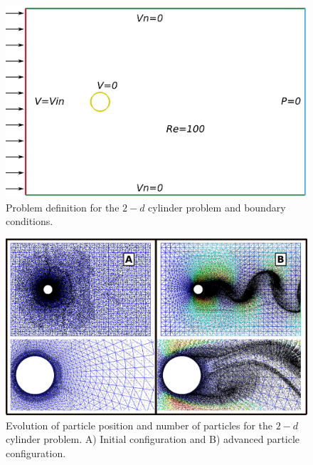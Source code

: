 \begin{figure}[htp] 
\centering 
\includegraphics[scale=.5]{./imgs/cyl_def.png}
\caption{Problem definition for the $2-d$ cylinder problem and boundary conditions.}
\label{fig:cyl_def}
\end{figure}
%
\begin{figure}[htp]
\centering 
\includegraphics[scale=.35]{./imgs/cyl_parts.png}
\caption{Evolution of particle position and number of particles for the $2-d$ cylinder problem. A) Initial configuration and B) advanced particle configuration.}
\label{fig:cyl_evol}
\end{figure}
%
